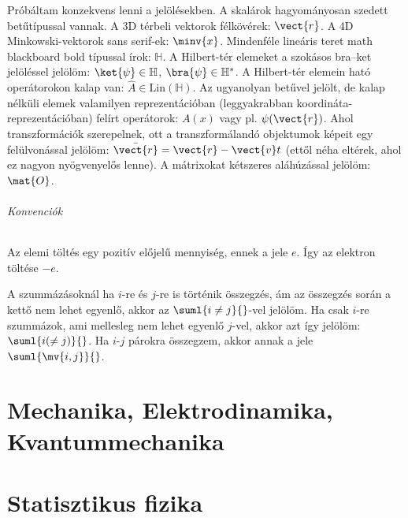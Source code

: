 \documentclass[a4paper,11pt,oneside,titlepage]{book}
\begin{document}
  Próbáltam konzekvens lenni a jelölésekben. A skalárok hagyományosan szedett betűtípussal vannak. A 3D térbeli vektorok félkövérek: $\vect{r}$. A 4D Minkowski-vektorok sans serif-ek: $\minv{x}$. Mindenféle lineáris teret math blackboard bold típussal írok: $\mathbb{H}$. A Hilbert-tér elemeket a szokásos bra--ket jelöléssel jelölöm: $\ket{\psi}\in\mathbb{H}$, $\bra{\psi}\in\mathbb{H}^*$. A Hilbert-tér elemein ható operátorokon kalap van: $\hat{A}\in\mathrm{Lin}(\mathbb{H})$. Az ugyanolyan betűvel jelölt, de kalap nélküli elemek valamilyen reprezentációban (leggyakrabban koordináta-reprezentációban) felírt operátorok: $A(x)$ vagy pl. $\psi(\vect{r})$. Ahol transzformációk szerepelnek, ott a transzformálandó objektumok képeit egy felülvonással jelölöm: $\bar{\vect{r}}=\vect{r}-\vect{v}t$ (ettől néha eltérek, ahol ez nagyon nyögvenyelős lenne). A mátrixokat kétszeres aláhúzással jelölöm: $\mat{O}$. 
  
  \paragraph{Konvenciók}
  Az elemi töltés egy pozitív előjelű mennyiség, ennek a jele $e$. Így az elektron töltése $-e$. 
  
  A szummázásoknál ha $i$-re és $j$-re is történik összegzés, ám az összegzés során a kettő nem lehet egyenlő, akkor az $\suml{i\ne j}{}$-vel jelölöm. Ha csak $i$-re szummázok, ami mellesleg nem lehet egyenlő $j$-vel, akkor azt így jelölöm: $\suml{i(\ne j)}{}$. Ha $i$-$j$ párokra összegzem, akkor annak a jele $\suml{\mv{i,j}}{}$.
  
  \setcounter{tocdepth}{0}
  \tableofcontents 
 
 \part{Mechanika, Elektrodinamika, Kvantummechanika}
 
  
  
  
  
  
  
  
  
  
  
  
  
  
  
  
  
  
 \part{Statisztikus fizika}
 
\end{document}
